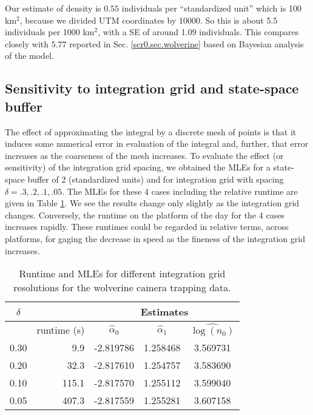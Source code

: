 {\flushleft Our} estimate of density is $0.55$ individuals per ``standardized
unit'' which is 100 km$^2$, because we divided UTM coordinates by
10000.  So this is about 5.5 individuals per 1000 km$^2$,
with a SE of around 1.09
individuals.  This compares closely with $5.77$
reported in
Sec. \ref{scr0.sec.wolverine} based on Bayesian
analysis of the model.


\subsection{Sensitivity to integration grid and state-space buffer}

The effect of approximating the integral by a discrete mesh of points
is that it induces some numerical error in evaluation of the integral
and, further, that error increases as the
coarseness of the mesh increases. 
To evaluate the effect (or sensitivity) of the integration grid
spacing, 
we obtained the MLEs for a state-space buffer of 2 (standardized
units) and for integration grid with spacing $\delta = .3, .2, .1,
.05$. The MLEs for these 4 cases including the relative runtime are
given in Table \ref{mle.tab.integration}.
We see the results change only slightly as the
integration grid changes. Conversely, the runtime on the platform of
the day for the 4 cases increases rapidly. 
These runtimes could be regarded in
relative terms,  across platforms, for gaging the decrease in
speed as the fineness of the integration grid increases.

\begin{table}[ht]
\centering
\caption{Runtime and MLEs for different integration grid resolutions
  for the wolverine camera trapping data.}
\begin{tabular}{crccc}
\hline \hline
$\delta$ &   & \multicolumn{3}{c}{Estimates} \\ \hline
         &  runtime (s)       & $\hat{\alpha}_0$ & $\hat{\alpha}_1$ &  $\widehat{\log(n_0)}$ \\ \hline
 0.30   &  9.9  &  -2.819786 & 1.258468 & 3.569731  \\
 0.20   & 32.3  &  -2.817610 & 1.254757 & 3.583690 \\
 0.10  & 115.1  &  -2.817570 & 1.255112 & 3.599040 \\
 0.05 &  407.3 &   -2.817559&  1.255281&  3.607158 \\ \hline
\end{tabular}
\label{mle.tab.integration}
\end{table}

